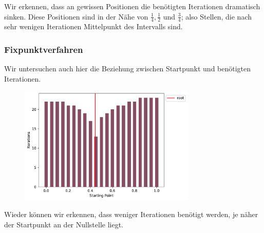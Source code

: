 \documentclass[a4paper,12pt]{article}
\newcommand{\1}{1\hspace{-0,9ex}1}
\begin{document}
Wir erkennen, dass an gewissen Positionen die benötigten Iterationen dramatisch sinken. Diese Positionen sind in der Nähe von $\frac{1}{4}, \frac{1}{2}$ und $\frac{3}{4}$; also Stellen, die nach sehr wenigen Iterationen Mittelpunkt des Intervalls sind.
\subsubsection*{Fixpunktverfahren}
Wir untersuchen auch hier die Beziehung zwischen Startpunkt und benötigten Iterationen.

\begin{figure}[H]
	\centering
	\includegraphics[width=0.75\textwidth]{plots/fixed_point_iterations_by_starting_point.pdf}
\end{figure}

Wieder können wir erkennen, dass weniger Iterationen benötigt werden, je näher der Startpunkt an der Nullstelle liegt.
\end{document}
